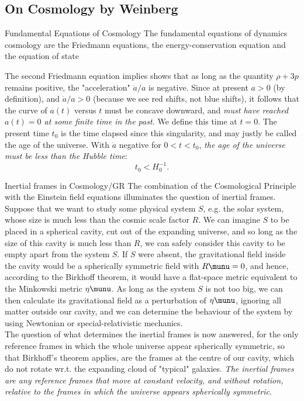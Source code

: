 \subsection{On Cosmology by Weinberg}
\begin{mybox}{Fundamental Equations of Cosmology}
	The fundamental equations of dynamics cosmology are the Friedmann equations, the energy-conservation equation and the equation of state
\end{mybox}
The second Friedmann equation implies shows that as long as the quantity $\rho+3p$ remains positive, the "acceleration" $\ddot{a}/a$ is negative. Since at present $a>0$ (by definition), and $\dot{a}/a >0$ (because we see red shifts, not blue shifts), it follows that the curve of $a(t)$ versus $t$ must be concave downward, and \emph{must have reached $a(t)=0$ at some finite time in the past.} We define this time at $t=0$. The present time $t_0$ is the time elapsed since this singularity, and may justly be called the age of the universe. With $\ddot{a}$ negative for $0<t<t_0$, \emph{the age of the universe must be less than the Hubble time}:
\begin{equation}
	t_0 < H^{-1}_0.
\end{equation}
\begin{mybox}{Inertial frames in Cosmology/GR}
	The combination of the Cosmological Principle with the Einstein field equations illuminates the question of inertial frames. Suppose that we want to study some physical system $S$, e.g. the solar system, whose size is much less than the cosmic scale factor $R$. We can imagine $S$ to be placed in a spherical cavity, cut out of the expanding universe, and so long as the size of this cavity is much less than $R$, we can safely consider this cavity to be empty apart from the system $S$. If $S$ were absent, the gravitational field inside the cavity would be a spherically symmetric field with $R\munu=0$, and hence, according to the Birkhoff theorem, it would have a flat-space metric equivalent to the Minkowski metric $\eta\munu$. As long as the system $S$ is not too big, we can then calculate its gravitational field as a perturbation of $\eta\munu$, ignoring all matter outside our cavity, and we can determine the behaviour of the system by using Newtonian or special-relativistic mechanics.\\
	The question of what determines the inertial frames is now answered, for the only reference frames in which the whole universe appear spherically symmetric, so that Birkhoff's theorem applies, are the frames at the centre of our cavity, which do not rotate wr.t. the expanding cloud of "typical" galaxies. \emph{The inertial frames are any reference frames that move at constant velocity, and without rotation, relative to the frames in which the universe appears spherically symmetric}.
\end{mybox}

